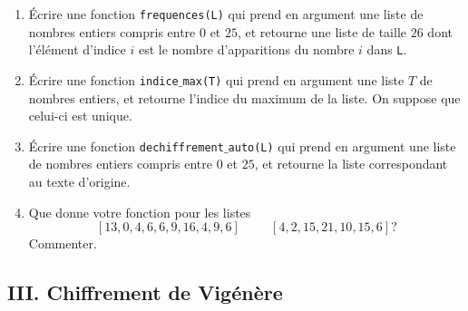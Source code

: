 \begin{enumerate}
  \item \'Ecrire une fonction \texttt{frequences(L)} qui prend en argument une liste de nombres entiers compris entre $0$ et $25$, et retourne une liste de taille $26$ dont l'élément d'indice $i$ est le nombre d'apparitions du nombre $i$ dans \texttt{L}.

  \item \'Ecrire une fonction \texttt{indice$\_$max(T)} qui prend en argument une liste $T$ de nombres entiers, et retourne l'indice du maximum de la liste. On suppose que celui-ci est unique.

  \item \'Ecrire une fonction \texttt{dechiffrement$\_$auto(L)} qui prend en argument une liste de nombres entiers compris entre $0$ et $25$, et retourne la liste correspondant au texte d'origine.

  \item Que donne votre fonction pour les listes 
  \[
   [13,0,4,6,6,9,16,4,9,6] \hspace{1cm} [4,2,15,21,10,15,6] ?
  \]
  Commenter.
\end{enumerate}

\subsection*{III. Chiffrement de Vigénère}

